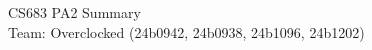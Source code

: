\documentclass[11pt,a4paper]{article}
\begin{document}
\begin{center}{\LARGE CS683 PA2 Summary}\\[4pt] Team: Overclocked (24b0942, 24b0938, 24b1096, 24b1202)\end{center}

% 
% 
% 
\end{document}
